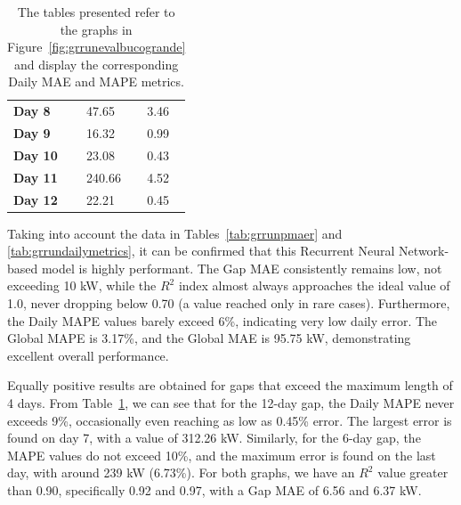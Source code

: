 \begin{table}[H]
\begin{minipage}[t]{.45\textwidth}
\begin{center}
\begin{tabular}[c]{l|l|l}
				\textbf{Day 8}  & 47.65                                  & 3.46 \\
				\textbf{Day 9}  & 16.32                                  & 0.99 \\
				\textbf{Day 10} & 23.08                                  & 0.43 \\
				\textbf{Day 11} & 240.66                                 & 4.52 \\
				\textbf{Day 12} & 22.21                                  & 0.45
			\end{tabular}
		\end{center}
	\end{minipage}
	\caption{The tables presented refer to the graphs in Figure~\ref{fig:grrunevalbucogrande} and display the corresponding Daily MAE and MAPE metrics.}\label{tab:grrunbuchigrandi}
\end{table}

Taking into account the data in Tables~\ref{tab:grrunpmaer}
and \ref{tab:grrundailymetrics}, it can be confirmed that this
Recurrent Neural Network-based model is highly performant.
The Gap MAE consistently remains low, not exceeding 10 kW,
while the $R^2$ index almost always approaches the ideal value of 1.0\cite{metrics}, never dropping below 0.70 (a value reached only in rare cases). Furthermore, the Daily MAPE values barely exceed 6\%, indicating very low daily error. The Global MAPE is 3.17\%, and the Global MAE is 95.75 kW, demonstrating excellent overall performance.


Equally positive results are obtained for gaps that exceed the
maximum length of 4 days.
From Table~\ref{tab:grrunbuchigrandi}, we can see that for the
12-day gap, the Daily MAPE never exceeds 9\%, occasionally even reaching as low as 0.45\% error. The largest error is found on day 7, with a value of 312.26 kW.
Similarly, for the 6-day gap, the MAPE values do not exceed 10\%,
and the maximum error is found on the last day, with around
239 kW (6.73\%).
For both graphs, we have an $R^2$ value greater than 0.90, specifically 0.92 and 0.97, with a Gap MAE of 6.56 and 6.37 kW.

